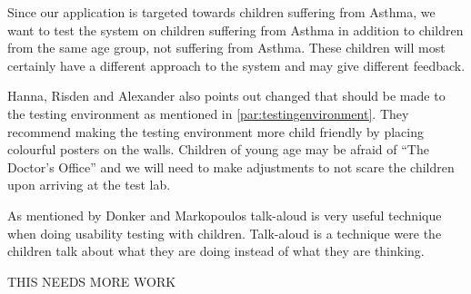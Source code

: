 Since our application is targeted towards children suffering from Asthma, we want to test the system on children suffering from Asthma in addition to children from the same age group, not suffering from Asthma. These children will most certainly have a different approach to the system and may give different feedback.

Hanna, Risden and Alexander also points out changed that should be made to the testing environment as mentioned in \ref{par:testingenvironment}. They recommend making the testing environment more child friendly by placing colourful posters on the walls.
Children of young age may be afraid of ``The Doctor's Office'' and we will need to make adjustments to not scare the children upon arriving at the test lab. 

As mentioned by Donker and Markopoulos \cite{TalkAloud} talk-aloud is very useful technique when doing usability testing with children. Talk-aloud is a technique were the children talk about what they are doing instead of what they are thinking.

THIS NEEDS MORE WORK

